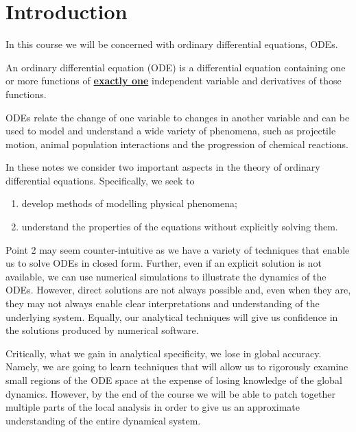 \chapter{Introduction}
In this course we will be concerned with ordinary differential equations, ODEs.

\begin{defin}
An ordinary differential equation (ODE) is a differential equation containing one or more functions of \underline{\textbf{exactly one}} independent variable and derivatives of those functions.
\end{defin}

ODEs relate the change of one variable to changes in another variable and can be used to model and understand a wide variety of phenomena, such as projectile motion, animal population interactions and the progression of chemical reactions.

In these notes we consider two important aspects in the theory of ordinary differential equations. Specifically, we seek to
\begin{enumerate}
\item develop methods of modelling physical phenomena;
\item understand the properties of the equations without explicitly solving them.
\end{enumerate}

Point 2 may seem counter-intuitive as we have a variety of techniques that enable us to solve ODEs in closed form. Further, even if an explicit solution is not available, we can use numerical simulations to illustrate the dynamics of the ODEs. However, direct solutions are not always possible and, even when they are, they may not always enable clear interpretations and understanding of the underlying system. Equally, our analytical techniques will give us confidence in the solutions produced by numerical software.

Critically, what we gain in analytical specificity, we lose in global accuracy. Namely, we are going to learn techniques that will allow us to rigorously examine small regions of the ODE space at the expense of losing knowledge of the global dynamics. However, by the end of the course we will be able to patch together multiple parts of the local analysis in order to give us an approximate understanding of the entire dynamical system.

